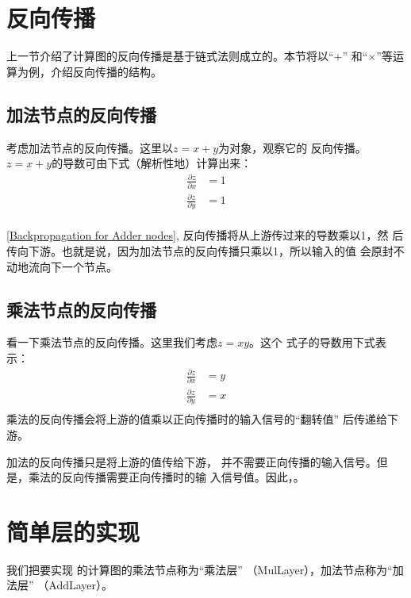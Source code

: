 \section{反向传播}
上一节介绍了计算图的反向传播是基于链式法则成立的。本节将以“$+$”
和“$\times$”等运算为例，介绍反向传播的结构。
\subsection{加法节点的反向传播}
考虑加法节点的反向传播。这里以$z = x + y$为对象，观察它的
反向传播。$z = x + y$的导数可由下式（解析性地）计算出来：
\begin{equation*}
    \begin{aligned}
        \frac{\partial z}{\partial x} & =1 \\
        \frac{\partial z}{\partial y} & =1 \\
    \end{aligned}
\end{equation*}

\autoref{Backpropagation for Adder nodes}, 反向传播将从上游传过来的导数乘以1，然
后传向下游。也就是说，因为加法节点的反向传播只乘以1，所以输入的值
会原封不动地流向下一个节点。


\subsection{乘法节点的反向传播}
看一下乘法节点的反向传播。这里我们考虑$z = xy$。这个
式子的导数用下式表示：
\begin{equation*}
    \begin{aligned}
        \frac{\partial z}{\partial x} & =y \\
        \frac{\partial z}{\partial y} & =x \\
    \end{aligned}
\end{equation*}
乘法的反向传播会将上游的值乘以正向传播时的输入信号的“翻转值”
后传递给下游。

加法的反向传播只是将上游的值传给下游，
并不需要正向传播的输入信号。但是，乘法的反向传播需要正向传播时的输
入信号值。因此，。


\section{简单层的实现}
我们把要实现
的计算图的乘法节点称为“乘法层”
（MulLayer），加法节点称为“加法层”
（AddLayer）。
